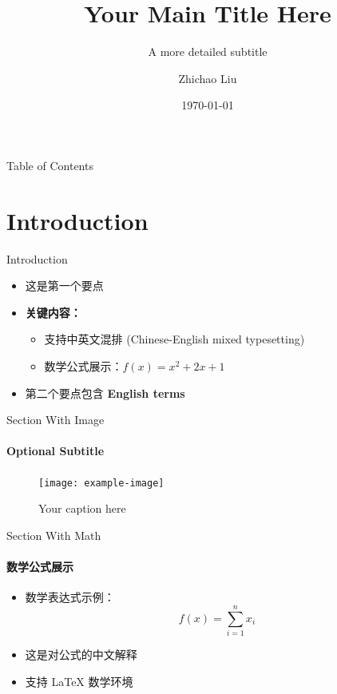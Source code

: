 \documentclass[aspectratio=169,12pt]{beamer}
\title{Your Main Title Here}
\subtitle{A more detailed subtitle}
\author{Zhichao Liu}
\institute{Harbin Institute of Technology}
\date{\today}
\begin{document}
\begin{frame}[standout]
    \titlepage
\end{frame}

\begin{frame}{Table of Contents}
    \tableofcontents
\end{frame}

\section{Introduction}
\begin{frame}{Introduction}
    \begin{itemize}
        \item 这是第一个要点
        \item \textbf{关键内容：} 
        \begin{itemize}
            \item 支持中英文混排 (Chinese-English mixed typesetting)
            \item 数学公式展示：$f(x) = x^2 + 2x + 1$
        \end{itemize}
        \item 第二个要点包含 \textbf{English terms}
    \end{itemize}
\end{frame}

\begin{frame}{Section With Image}
    \framesubtitle{Optional Subtitle}
    \begin{figure}
        \texttt{[image: example-image]}
        \caption{Your caption here}
    \end{figure}
\end{frame}

\begin{frame}{Section With Math}
    \framesubtitle{数学公式展示}
    \begin{itemize}
        \item 数学表达式示例：
            \[
            f(x) = \sum_{i=1}^{n} x_i
            \]
        \item 这是对公式的中文解释
        \item 支持 LaTeX 数学环境
    \end{itemize}
\end{frame}
\end{document}
